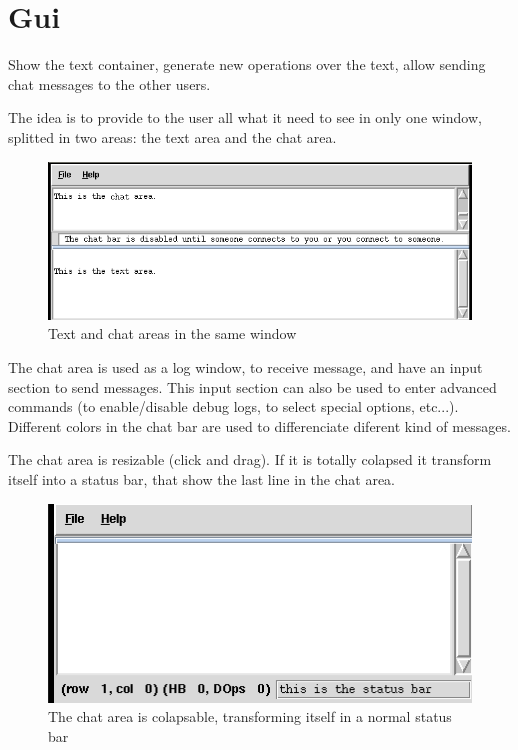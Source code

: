 \documentclass{report}
\begin{document}
\section{Gui}

Show the text container, generate new operations over the text, allow sending chat messages to the other users.

The idea is to provide to the user all what it need to see in only one window, splitted in two areas: the text area and the chat area.

\begin{figure}[htbp]
 \begin{center}
    \includegraphics[angle=0,width=0.5\linewidth]{schemas/text_and_chat_area.png}
 \end{center}
 \label{fig:textandchatarea}
 \caption{Text and chat areas in the same window}
\end{figure}

  
The chat area is used as a log window, to receive message, and have an input section to send messages. This input section can also be used to enter advanced commands (to enable/disable debug logs, to select special options, etc...). Different colors in the chat bar are used to differenciate diferent kind of messages.

The chat area is resizable (click and drag). If  it is totally colapsed it transform itself into a status bar, that show the last line in the chat area.

\begin{figure}[htbp]
 \begin{center}
    \includegraphics[angle=0,width=0.5\linewidth]{schemas/colapsable_chat_area.png}
 \end{center}
 \label{fig:colapsablechatarea}
 \caption{The chat area is colapsable, transforming itself in a normal status bar}
\end{figure}
\end{document}

